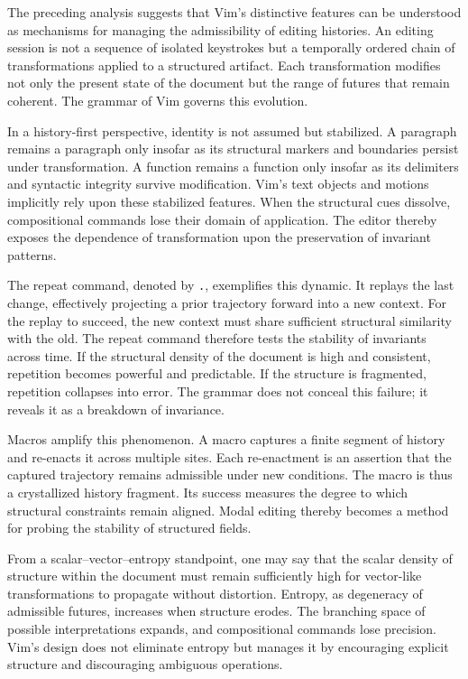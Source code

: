 \documentclass[12pt]{article}
\begin{document}
The preceding analysis suggests that Vim’s distinctive features can be understood as mechanisms for managing the admissibility of editing histories. An editing session is not a sequence of isolated keystrokes but a temporally ordered chain of transformations applied to a structured artifact. Each transformation modifies not only the present state of the document but the range of futures that remain coherent. The grammar of Vim governs this evolution.

In a history-first perspective, identity is not assumed but stabilized. A paragraph remains a paragraph only insofar as its structural markers and boundaries persist under transformation. A function remains a function only insofar as its delimiters and syntactic integrity survive modification. Vim’s text objects and motions implicitly rely upon these stabilized features. When the structural cues dissolve, compositional commands lose their domain of application. The editor thereby exposes the dependence of transformation upon the preservation of invariant patterns.

The repeat command, denoted by \texttt{.}, exemplifies this dynamic. It replays the last change, effectively projecting a prior trajectory forward into a new context. For the replay to succeed, the new context must share sufficient structural similarity with the old. The repeat command therefore tests the stability of invariants across time. If the structural density of the document is high and consistent, repetition becomes powerful and predictable. If the structure is fragmented, repetition collapses into error. The grammar does not conceal this failure; it reveals it as a breakdown of invariance.

Macros amplify this phenomenon. A macro captures a finite segment of history and re-enacts it across multiple sites. Each re-enactment is an assertion that the captured trajectory remains admissible under new conditions. The macro is thus a crystallized history fragment. Its success measures the degree to which structural constraints remain aligned. Modal editing thereby becomes a method for probing the stability of structured fields.

From a scalar–vector–entropy standpoint, one may say that the scalar density of structure within the document must remain sufficiently high for vector-like transformations to propagate without distortion. Entropy, as degeneracy of admissible futures, increases when structure erodes. The branching space of possible interpretations expands, and compositional commands lose precision. Vim’s design does not eliminate entropy but manages it by encouraging explicit structure and discouraging ambiguous operations.
\end{document}
